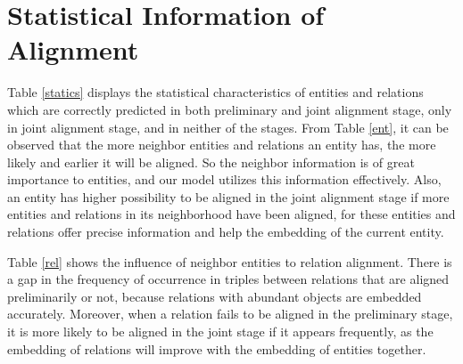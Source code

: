 \documentclass[11pt,a4paper]{article}
\begin{document}
\section{Statistical Information of Alignment}
Table \ref{statics} displays the statistical characteristics of entities and relations which are correctly predicted in both preliminary and joint alignment stage, only in joint alignment stage, and in neither of the stages. From Table \ref{ent}, it can be observed that the more neighbor entities and relations an entity has, the more likely and earlier it will be aligned. So the neighbor information is of great importance to entities, and our model utilizes this information effectively. Also, an entity has higher possibility to be aligned in the joint alignment stage if more entities and relations in its neighborhood have been aligned, for these entities and relations offer precise information and help the embedding of the current entity.


Table \ref{rel} shows the influence of neighbor entities to relation alignment. There is a gap in the frequency of occurrence in triples between relations that are aligned preliminarily or not, because relations with abundant objects are embedded accurately. Moreover, when a relation fails to be aligned in the preliminary stage, it is more likely to be aligned in the joint stage if it appears frequently, as the embedding of relations will improve with the embedding of entities together.
\end{document}
